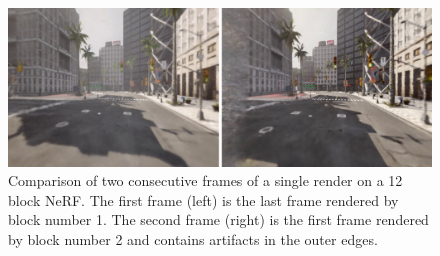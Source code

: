 \begin{figure}[!h]
    \centering
    \includegraphics[width=1.0\textwidth]{figures/block-nerf-frame-comparison.png}
    \caption[Comparison of consecutive frames in the overlap between Block-NeRFs.]{Comparison of two consecutive frames of a single render on a 12 block NeRF. The first frame (left) is the last frame rendered by block number 1. The second frame (right) is the first frame rendered by block number 2 and contains artifacts in the outer edges.}
    \label{fig:block-nerf-frame-comparison}
\end{figure}